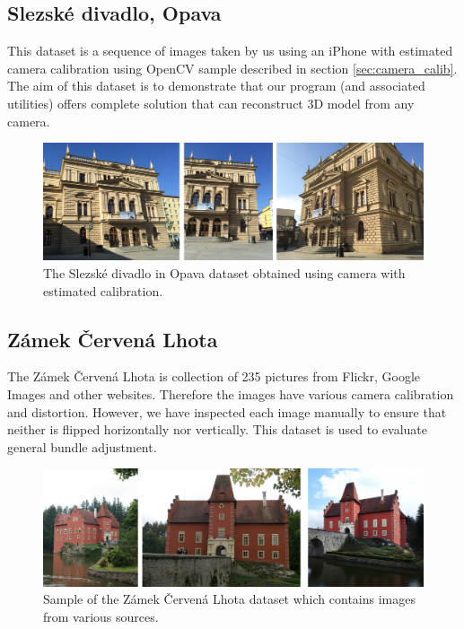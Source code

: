\subsection*{Slezské divadlo, Opava}
This dataset is a sequence of images taken by us using an iPhone with estimated camera calibration using OpenCV sample described in section \ref{sec:camera_calib}. The aim of this dataset is to demonstrate that our program (and associated utilities) offers complete solution that can reconstruct 3D model from any camera.

\begin{figure}[ht]
	\begin{center}
		\includegraphics[keepaspectratio,width=\textwidth]{fig/experiments-divadlo.pdf}
	\end{center}
	\caption{The Slezské divadlo in Opava dataset obtained using camera with estimated calibration.}
	\label{fig:divadlo}
\end{figure}

\subsection*{Zámek Červená Lhota}
The Zámek  Červená Lhota is collection of 235 pictures from Flickr, Google Images and other websites. Therefore the images have various camera calibration and distortion. However, we have inspected each image manually to ensure that neither is flipped horizontally nor vertically. This dataset is used to evaluate general bundle adjustment.

\begin{figure}[ht]
	\begin{center}
		\includegraphics[keepaspectratio,width=\textwidth]{fig/experiments-cervena-lhota.pdf}
	\end{center}
	\caption{Sample of the Zámek Červená Lhota dataset which contains images from various sources.}
	\label{fig:cervena-lhota}
\end{figure}

